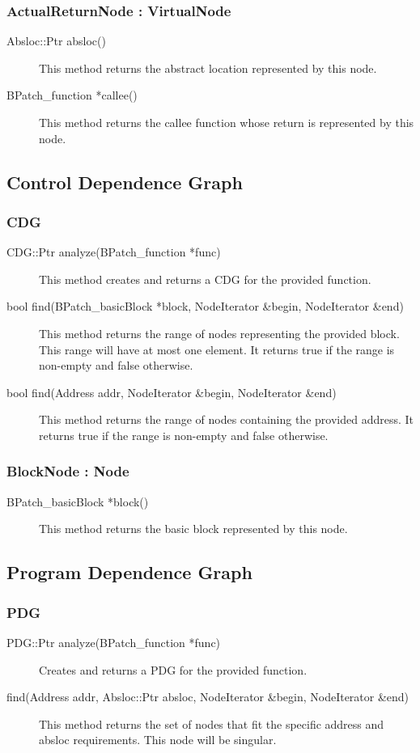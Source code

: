 \documentclass[12pt,titlepage]{article}
\begin{document}
\subsubsection{ActualReturnNode : VirtualNode}
\begin{description}
\item[Absloc::Ptr absloc()]
This method returns the abstract location represented by this node.
\item[BPatch\_function *callee() ]
This method returns the callee function whose return is represented by this node.
\end{description}

\subsection{Control Dependence Graph}
\subsubsection{CDG}
\begin{description}
\item[CDG::Ptr analyze(BPatch\_function *func)]
This method creates and returns a CDG for the provided function.
\item[bool find(BPatch\_basicBlock *block, NodeIterator \&begin, NodeIterator \&end)]
This method returns the range of nodes representing the provided
block. This range will have at most one element. It returns true if
the range is non-empty and false otherwise. 
\item[bool find(Address addr, NodeIterator \&begin, NodeIterator
\&end)] This method returns the range of nodes containing the provided
address. It returns true if the range is non-empty and false
otherwise.
\end{description}

\subsubsection{BlockNode : Node}
\begin{description}
\item[BPatch\_basicBlock *block() ]
This method returns the basic block represented by this node. 
\end{description}

\subsection{Program Dependence Graph}
\subsubsection{PDG}
\begin{description}
\item[PDG::Ptr analyze(BPatch\_function *func)]
Creates and returns a PDG for the provided function.
\item[find(Address addr, Absloc::Ptr absloc, NodeIterator \&begin, NodeIterator \&end) ]
This method returns the set of nodes that fit the specific address and absloc requirements. This node will be singular.
\end{description}
\end{document}
